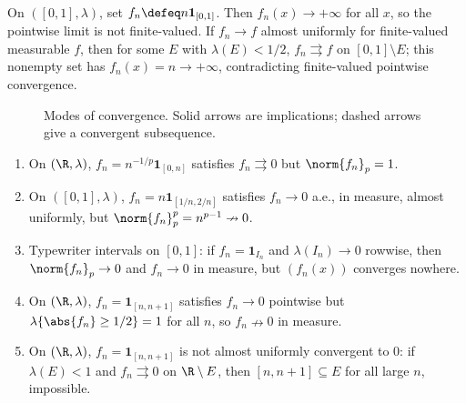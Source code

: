 \begin{example} \label{ex:egoroff-needs-finite-valued-limit} \\
On $([0,1],\lambda)$, set $f_n\defeq n\mathbf{1}_{[0,1]}$. Then $f_n(x)\to+\infty$ for all $x$, so the pointwise limit is not finite-valued. If $f_n\to f$ almost uniformly for finite-valued measurable $f$, then for some $E$ with $\lambda(E)<1/2$, $f_n\rightrightarrows f$ on $[0,1]\setminus E$; this nonempty set has $f_n(x)=n\to+\infty$, contradicting finite-valued pointwise convergence.
\end{example}

\begin{figure}[H]
  \centering
  
  \caption{Modes of convergence. Solid arrows are implications; dashed arrows give a convergent subsequence.}
  \label{fig:modes-convergence-implication-diagrams}
\end{figure}

\begin{method} \label{meth:modes-of-convergence-counterexample-dictionary} 
\begin{enumerate}[label=(\roman*)]
\setlength{\itemsep}{0pt}
\item On $(\R,\lambda)$, $f_n=n^{-1/p}\mathbf{1}_{[0,n]}$ satisfies $f_n\rightrightarrows0$ but $\norm{f_n}_p=1$.
\item On $([0,1],\lambda)$, $f_n=n\mathbf{1}_{[1/n,2/n]}$ satisfies $f_n\to0$ a.e., in measure, almost uniformly, but $\norm{f_n}_p^p=n^{p-1}\nrightarrow0$.
\item Typewriter intervals on $[0,1]$: if $f_n=\mathbf{1}_{I_n}$ and $\lambda(I_n)\to0$ rowwise, then $\norm{f_n}_p\to0$ and $f_n\to0$ in measure, but $(f_n(x))$ converges nowhere.
\item On $(\R,\lambda)$, $f_n=\mathbf{1}_{[n,n+1]}$ satisfies $f_n\to0$ pointwise but $\lambda\{\abs{f_n}\geq1/2\}=1$ for all $n$, so $f_n\nrightarrow0$ in measure.
\item On $(\R,\lambda)$, $f_n=\mathbf{1}_{[n,n+1]}$ is not almost uniformly convergent to $0$: if $\lambda(E)<1$ and $f_n\rightrightarrows0$ on $\R\setminus E$, then $[n,n+1]\subseteq E$ for all large $n$, impossible.
\end{enumerate}
\end{method}


